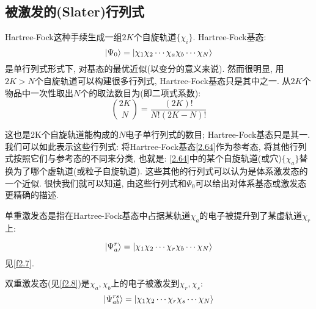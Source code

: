 \subsection{被激发的(Slater)行列式}
 \label{sec2.2.6}
Hartree-Fock这种手续生成一组$2K$个自旋轨道$\{\chi_i\}$. Hartree-Fock基态:
\begin{equation}
\label{2.64}
\Ket{\Psi_0}=\Ket{\chi_1\chi_2\cdots\chi_a\chi_b\cdots\chi_N}
\end{equation}
是单行列式形式下, 对基态的最优近似(以变分的意义来说). 然而很明显, 用$2K>N$个自旋轨道可以构建很多行列式, Hartree-Fock基态只是其中之一. 从$2K$个物品中一次性取出$N$个的取法数目为(即二项式系数):
\begin{equation*}
\binom{2K}{N}=\frac{(2K)!}{N!(2K-N)!}
\end{equation*}

这也是2K个自旋轨道能构成的$N$电子单行列式的数目; Hartree-Fock基态只是其一. 我们可以如此表示这些行列式: 将Hartree-Fock基态\ref{2.64}作为参考态, 将其他行列式按照它们与参考态的不同来分类, 也就是: \ref{2.64}中的某个自旋轨道(或穴)$\{\chi_a\}$替换为了哪个虚轨道(或粒子自旋轨道). 这些其他的行列式可以认为是体系激发态的一个近似. 很快我们就可以知道, 由这些行列式和$\Psi_0$可以给出对体系基态或激发态更精确的描述.

单重激发态是指在Hartree-Fock基态中占据某轨道$\chi_a$的电子被提升到了某虚轨道$\chi_r$上:

\begin{equation}
\Ket{\Psi_a^r}=\Ket{\chi_1\chi_2\cdots\chi_r\chi_b\cdots\chi_N}
\end{equation}
见\ref{f2.7}.

双重激发态(见\ref{f2.8})是$\chi_a,\chi_b$上的电子被激发到$\chi_r,\chi_s$:
\begin{equation}
\Ket{\Psi_{ab}^{rs}}=\Ket{\chi_1\chi_2\cdots\chi_r\chi_s\cdots\chi_N}
\end{equation}

